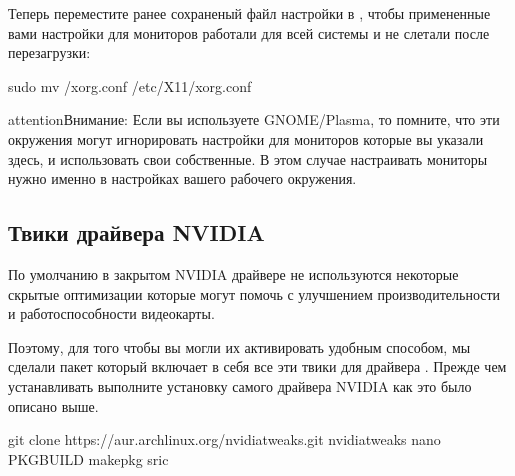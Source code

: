 \documentclass[letterpaper,10pt,russian,openany]{sphinxmanual}
\begin{document}
\noindent{}

\sphinxAtStartPar
Теперь переместите ранее сохраненый файл настройки в , чтобы примененные вами настройки для мониторов
работали для всей системы и не слетали после перезагрузки:

\begin{sphinxVerbatim}[commandchars=\\\{\}]
sudo mv \PYGZti{}/xorg.conf /etc/X11/xorg.conf
\end{sphinxVerbatim}

\begin{sphinxadmonition}{attention}{Внимание:}
\sphinxAtStartPar
Если вы используете GNOME/Plasma, то помните, что эти окружения могут игнорировать настройки для мониторов которые вы указали здесь,
и использовать свои собственные. В этом случае настраивать мониторы нужно именно в настройках вашего рабочего окружения.
\end{sphinxadmonition}

\ignorespaces 

\subsection{Твики драйвера NVIDIA}
\label{\detokenize{source/first-steps:nvidia-tweaking}}\label{\detokenize{source/first-steps:index-9}}\label{\detokenize{source/first-steps:id9}}
\sphinxAtStartPar
По умолчанию в закрытом NVIDIA драйвере не используются некоторые скрытые оптимизации которые могут помочь с улучшением производительности и работоспособности видеокарты.

\sphinxAtStartPar
Поэтому, для того чтобы вы могли их активировать удобным способом, мы сделали пакет который включает в себя все эти твики для драйвера
\sphinxhyphen{} . Прежде чем устанавливать выполните установку самого драйвера NVIDIA как это было описано выше.

\sphinxAtStartPar
{}

\begin{sphinxVerbatim}[commandchars=\\\{\}]
git clone https://aur.archlinux.org/nvidia\PYGZhy{}tweaks.git
 nvidia\PYGZhy{}tweaks
nano PKGBUILD 
makepkg \PYGZhy{}sric
\end{sphinxVerbatim}
\end{document}
